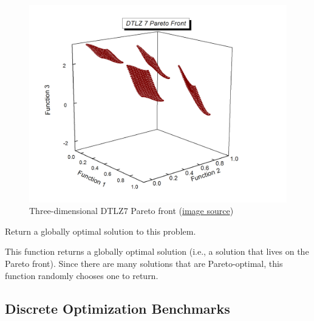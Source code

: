 \documentclass[letterpaper,10pt,english]{sphinxmanual}
\begin{document}
\begin{fulllineitems}
\begin{figure}[htbp]
\includegraphics{dtlz7funb.jpg}
\caption{Three-dimensional DTLZ7 Pareto front 
(\href{http://delta.cs.cinvestav.mx/~ccoello/EMOO/testfuncs/}{image source})}\end{figure}

\begin{fulllineitems}
\label{reference:inspyred.benchmarks.DTLZ7.global_optimum}
Return a globally optimal solution to this problem.

This function returns a globally optimal solution (i.e., a 
solution that lives on the Pareto front). Since there are many
solutions that are Pareto-optimal, this function randomly 
chooses one to return.

\end{fulllineitems}


\end{fulllineitems}



\subsection{Discrete Optimization Benchmarks}
\label{reference:discrete-optimization-benchmarks}
\end{document}

